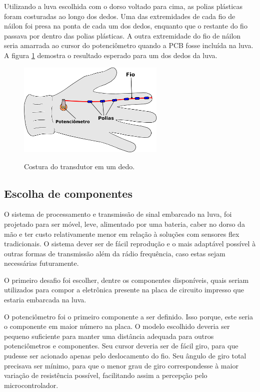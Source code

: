\documentclass[
	12pt,				%
	openright,			%
	oneside,			%
	a4paper,			%
	english,			%
	brazil				%
	]{abntex2}
\begin{document}
		Utilizando a luva escolhida com o dorso voltado para cima, as polias plásticas foram costuradas ao longo dos dedos. Uma das extremidades de cada fio de náilon foi presa na ponta de cada um dos dedos, enquanto que o restante do fio passava por dentro das polias plásticas. A outra extremidade do fio de náilon seria amarrada ao cursor do potenciômetro quando a PCB fosse incluída na luva. A figura \ref{Fig:glove-wire-pot1} demostra o resultado esperado para um dos dedos da luva.


		\begin{figure}[h!]
			\centering
			\caption{Costura do transdutor em um dedo.}
  		\includegraphics[width=7cm]{./figures/glove-wire-pot1.png}
  		\label{Fig:glove-wire-pot1}
		\end{figure}

			
			\subsection{Escolha de componentes}	

			O sistema de processamento e transmissão de sinal embarcado na luva, foi projetado para ser móvel, leve, alimentado por uma bateria, caber no dorso da mão e ter custo relativamente menor em relação à soluções com sensores flex tradicionais. O sistema dever ser de fácil reprodução e o mais adaptável possível à outras formas de transmissão além da rádio frequência, caso estas sejam necessárias futuramente.

			O primeiro desafio foi escolher, dentre os componentes disponíveis, quais seriam utilizados para compor a eletrônica presente na placa de circuito impresso que estaria embarcada na luva.

			O potenciômetro foi o primeiro componente a ser definido. Isso porque, este seria o componente  em maior número na placa. O modelo escolhido deveria ser pequeno suficiente para manter uma distância adequada para outros potenciômetros e componentes. Seu cursor deveria ser de fácil giro, para que pudesse ser acionado apenas pelo deslocamento do fio. Seu ângulo de giro total precisava ser mínimo, para que o menor grau de giro correspondesse à maior variação de resistência possível, facilitando assim a percepção pelo microcontrolador.
\end{document}
